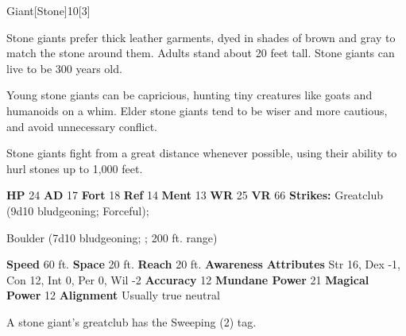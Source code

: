   \begin{monsection}{Giant}[Stone]{10}[3]
    \vspace{-1em}\vspace{-1em}
    \vspace{0em}

    
      Stone giants prefer thick leather garments, dyed in shades of brown and gray to match the stone around them. Adults stand about 20 feet tall. Stone giants can live to be 300 years old.

      Young stone giants can be capricious, hunting tiny creatures like goats and humanoids on a whim.
      Elder stone giants tend to be wiser and more cautious, and avoid unnecessary conflict.
    
      Stone giants fight from a great distance whenever possible, using their ability to hurl stones up to 1,000 feet.
    

    \begin{spellcontent}
      \begin{spelltargetinginfo}
        \pari \textbf{HP} 24 \monsep
          \textbf{AD} 17 \monsep
          \textbf{Fort} 18 \monsep
          \textbf{Ref} 14 \monsep
          \textbf{Ment} 13
        \pari \textbf{WR} 25 \monsep
        \textbf{VR} 66
        \pari \textbf{Strikes:}
            Greatclub  (9d10 bludgeoning; Forceful);
\par Boulder  (7d10 bludgeoning; ; 200 ft. range)
      \end{spelltargetinginfo}
    \end{spellcontent}
    \begin{monsterfooter}
      \pari \textbf{Speed} 60 ft. \monsep
        \textbf{Space} 20 ft. \monsep
        \textbf{Reach} 20 ft.
      \pari \textbf{Awareness} 
      \pari \textbf{Attributes}
        Str 16, Dex -1,
        Con 12, Int 0,
        Per 0, Wil -2
      \pari \textbf{Accuracy} 12 \monsep
        \textbf{Mundane Power} 21 \monsep
      \textbf{Magical Power} 12
      \pari \textbf{Alignment} Usually true neutral
    \end{monsterfooter}
  \end{monsection}
   A stone giant's greatclub has the Sweeping (2) tag.
  
